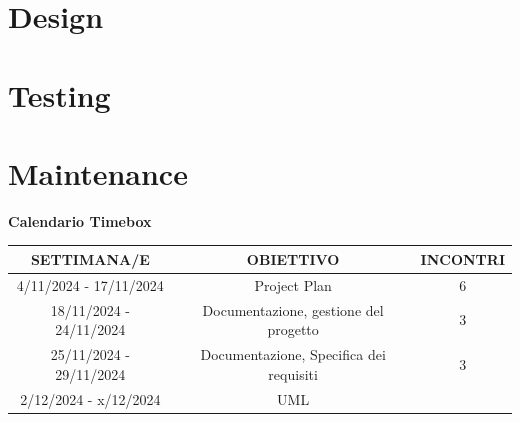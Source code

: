 \documentclass[a4paper,12pt]{article}
\begin{document}
\section{Design}

\section{Testing}

\section{Maintenance}


\newpage
\begin{center}
\Huge \textbf{Calendario Timebox}
\end{center}

\begin{center}
\begin{tabular}{|c|c|c|}
\hline
\textbf{SETTIMANA/E} & \textbf{OBIETTIVO} & \textbf{INCONTRI } \\
\hline
4/11/2024 - 17/11/2024 & Project Plan & 6 \\
\hline
18/11/2024 - 24/11/2024 & Documentazione, gestione del progetto & 3 \\
\hline
25/11/2024 - 29/11/2024 & Documentazione, Specifica dei requisiti  & 3 \\
\hline
2/12/2024 - x/12/2024 & UML &  \\
\hline
\end{tabular}
\end{center}
\end{document}
